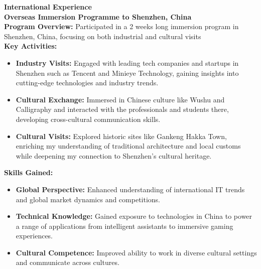 \documentclass[10pt,A4]{article}
\newcommand{\activities}[6] {
    \textcolor{royalpurple} {\textbf{#1}} \\[5pt]
    \textbf{#2} \hfill \colorbox{maincol}{\makebox[0.15\textwidth]{\textit{#3}}} \\[5pt]
	\textbf{Program Overview:} #4 \\[10pt]
	\textbf{Key Activities:}
	\begin{itemize}
		#5
	\end{itemize}
	\textbf{Skills Gained:} 
	\begin{itemize}
		#6
	\end{itemize}
}
\begin{document}
\begin{paracol}{2}
\begin{rightcolumn}
\activities
	{International Experience}
	{Overseas Immersion Programme to Shenzhen, China}
	{March 2024}
	{Participated in a 2 weeks long immersion program in Shenzhen, China, focusing on both industrial and cultural visits}
	{
        \item \textbf{Industry Visits:} Engaged with leading tech companies and startups in Shenzhen such as Tencent and Minieye Technology, gaining insights into cutting-edge technologies and industry trends.
        \item \textbf{Cultural Exchange:} Immersed in Chinese culture like Wushu and Calligraphy and interacted with the professionals and students there, developing cross-cultural communication skills.
        \item \textbf{Cultural Visits:} Explored historic sites like Gankeng Hakka Town, enriching my understanding of traditional architecture and local customs while deepening my connection to Shenzhen’s cultural heritage.}
    {
        \item \textbf{Global Perspective:} Enhanced understanding of international IT trends and global market dynamics and competitions.
        \item \textbf{Technical Knowledge:} Gained exposure to technologies in China to power a range of applications from intelligent assistants to immersive gaming experiences.
        \item \textbf{Cultural Competence:} Improved ability to work in diverse cultural settings and communicate across cultures.
    }

\vfill\null

\mbox{}
\vfill
\mbox{}
\vfill
\mbox{}
\vfill
\mbox{}
\end{rightcolumn}
\end{paracol}
\end{document}
